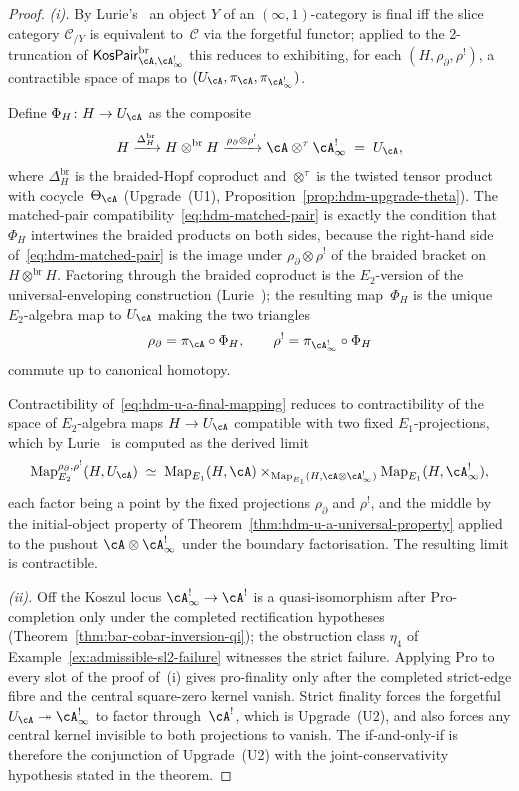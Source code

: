 \begin{proof}
\emph{(i).} By Lurie's~\cite[Prop.~5.2.7.4]{HA} an object $Y$ of an
$(\infty,1)$-category is final iff the slice category $\mathcal C_{/Y}$
is equivalent to~$\mathcal C$ via the forgetful functor; applied to the
2-truncation of
$\mathsf{KosPair}^{\mathrm{br}}_{\cA,\cA^!_\infty}$ this reduces
to exhibiting, for each $(H,\rho_\partial,\rho^!)$, a contractible
space of maps to $(U_\cA,\pi_\cA,\pi_{\cA^!_\infty})$.

Define $\Phi_H\colon H\to U_\cA$ as the composite
\[
H
\xrightarrow{\Delta^{\mathrm{br}}_H}
H\otimes^{\mathrm{br}} H
\xrightarrow{\rho_\partial\otimes\rho^!}
\cA\otimes^\tau \cA^!_\infty
\;=\;U_\cA,
\]
where $\Delta^{\mathrm{br}}_H$ is the braided-Hopf coproduct and
$\otimes^\tau$ is the twisted tensor product with cocycle~$\Theta_\cA$
(Upgrade~(U1), Proposition~\ref{prop:hdm-upgrade-theta}). The
matched-pair compatibility~\eqref{eq:hdm-matched-pair} is exactly the
condition that $\Phi_H$ intertwines the braided products on both
sides, because the right-hand side of~\eqref{eq:hdm-matched-pair} is
the image under $\rho_\partial\otimes\rho^!$ of the braided bracket on
$H\otimes^{\mathrm{br}} H$. Factoring through the braided coproduct
is the $E_2$-version of the universal-enveloping construction
(Lurie~\cite[5.3.1]{HA}); the resulting map~$\Phi_H$ is the unique
$E_2$-algebra map to $U_\cA$ making the two triangles
\[
\rho_\partial = \pi_\cA\circ\Phi_H,
\qquad
\rho^! = \pi_{\cA^!_\infty}\circ\Phi_H
\]
commute up to canonical homotopy.

Contractibility of~\eqref{eq:hdm-u-a-final-mapping} reduces to
contractibility of the space of $E_2$-algebra maps $H\to U_\cA$
compatible with two fixed $E_1$-projections, which by
Lurie~\cite[Thm.~5.5.3.18]{HA} is computed as the derived limit
\[
\mathrm{Map}_{E_2}^{\rho_\partial,\rho^!}(H,U_\cA)
\;\simeq\;
\mathrm{Map}_{E_1}(H,\cA)\times_{\mathrm{Map}_{E_1}(H,\cA\otimes\cA^!_\infty)}
\mathrm{Map}_{E_1}(H,\cA^!_\infty),
\]
each factor being a point by the fixed projections $\rho_\partial$
and $\rho^!$, and the middle by the initial-object property of
Theorem~\ref{thm:hdm-u-a-universal-property} applied to the pushout
$\cA\otimes\cA^!_\infty$ under the boundary factorisation. The
resulting limit is contractible.

\emph{(ii).} Off the Koszul locus $\cA^!_\infty\to\cA^!$ is a
quasi-isomorphism after $\mathrm{Pro}$-completion only under the
completed rectification hypotheses
(Theorem~\ref{thm:bar-cobar-inversion-qi}); the obstruction class
$\eta_4$ of Example~\ref{ex:admissible-sl2-failure} witnesses the
strict failure. Applying $\mathrm{Pro}$ to every slot of the proof
of~(i) gives pro-finality only after the completed strict-edge fibre
and the central square-zero kernel vanish. Strict finality forces the
forgetful $U_\cA\twoheadrightarrow\cA^!_\infty$ to factor
through~$\cA^!$, which is Upgrade~(U2), and also forces any central
kernel invisible to both projections to vanish. The if-and-only-if is
therefore the conjunction of Upgrade~(U2) with the joint-conservativity
hypothesis stated in the theorem.
\end{proof}

